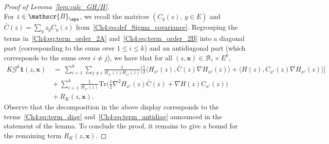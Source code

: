 \begin{refsegment}
\begin{proof}[Proof of Lemma~\ref{lem:calc_GH/H}]
\[\]
For $z\in\mathscr{B}_{\eps}$, we recall the matrices $(C_y(z),\ y\in E)$ and $\bar C(z)=\sum_y z_y C_y(z)$ from~\eqref{Ch4:eq:def_Sigma_covariance}. Regrouping the terms in~\eqref{Ch4:eq:term_order_2A} and~\eqref{Ch4:eq:term_order_2B} into a diagonal part (corresponding to the sums over  $1\leq i\leq k$) and an antidiagonal part (which corresponds to the sums over $i\neq j$),
 we have that for all $(z,\bm x)\in \mathscr{B}_\gamma\times E^k$,
\begin{align*}
K\mathcal{G}^k\bm{1}(z,\bm x)\ &=\ 
\sum_{i=1}^k\sum_{j\neq i}\frac{1}{H_{x^i}(z)H_{x^j}(z)} \bigg[ \frac{1}{2}\big\langle H_{x^i}(z)  ,\bar C(z)\nabla H_{x^j}(z)\big\rangle 
+ \big\langle H(z)  , C_{x^i}(z)\nabla H_{x^j}(z)\big\rangle \bigg]
\\
&+\ \sum_{i=1}^k\frac{1}{H_{x^i}(z)}\mathrm{Tr}\Big(
  \frac{1}{2} \nabla^2 H_{x^i}(z) \bar C(z)
  +  \nabla H(z)  C_{x^i}(z)\Big)
\\ 
&+\ R_K(z,\bm x).
\end{align*}
Observe that the decomposition in the above display corresponds to the terms~\eqref{Ch4:eq:term_diag} and~\eqref{Ch4:eq:term_antidiag} announced in the statement of the lemma.
To conclude the proof, it remains to give a bound for the remaining term $R_K(z,\bm x)$.


\end{proof}
\end{refsegment}
